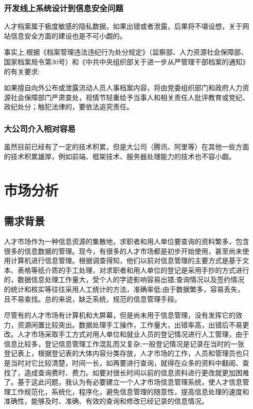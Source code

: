\documentclass[master]{hduthesis}
\begin{document}
\subsubsection{开发线上系统设计到信息安全问题}
人才档案属于极度敏感的隐私数据，如果出错或者泄露，后果将不堪设想，关于网站信息安全方面的建设也是不可小觑的。

事实上,根据《档案管理违法违纪行为处分规定》（监察部、人力资源社会保障部、国家档案局令第30号）和《中共中央组织部关于进一步从严管理干部档案的通知》的有关要求:

如果擅自向外公布或泄露流动人员人事档案内容，将由党委组织部门和政府人力资源社会保障部门严肃查处，视情节轻重给予当事人和相关责任人批评教育或党纪、政纪处分；触犯法律的，要依法追究责任。
\subsubsection{大公司介入相对容易}
虽然目前已经有了一定的技术积累，但是大公司（腾讯、阿里等）在其他一些方面的技术积累雄厚，例如前端、框架技术、服务器处理能力的技术也不容小觑。
\section{市场分析}
\subsection{需求背景}
人才市场作为一种信息资源的集散地，求职者和用人单位要查询的资料繁多，包含很多的信息数据的管理。现今，有很多的人才市场都是初步开始使用，甚至尚未使用计算机进行信息管理。根据调查得知，他们以前对信息管理的主要方式是基于文本、表格等纸介质的手工处理，对求职者和用人单位的登记是采用手抄的方式进行的，数据信息处理工作量大，受个人的字迹影响容易出错;查询情况以及签约情况的统计和核实等往往采用人工统计的方法，准确率低;由于数据繁多，容易丢失，且不易查找。总的来说，缺乏系统，规范的信息管理手段。


尽管有的人才市场有计算机和大屏幕，但是尚未用于信息管理，没有发挥它的效力，资源闲置比较突出。数据处理手工操作，工作量大，出错率高，出错后不易更改。人才市场采取手工方式对用人单位和就业人员的登记情况进行人工管理，由于信息比较多，登记信息管理工作混乱而又复杂;一般登记情况是记录在当时的一张登记表上，根据登记表的大体内容分类存放，人才市场的工作，人员和管理员也只是当时对它比较清楚，时间一长，如再要进行查询，就得在众多的资料中翻阅、查找了，造成查询费时、费力。如要对很长时间以前的信息资料进行更改就更加困难了。基于这此问题，我认为有必要建立一个人才市场信息管理系统，使人才信息管理工作规范化，系统化，程序化，避免信息管理的随意性，提高信息处理的速度和准确性，能够及时、准确、有效的查询和修改已经记录的信息情况。
\end{document}
